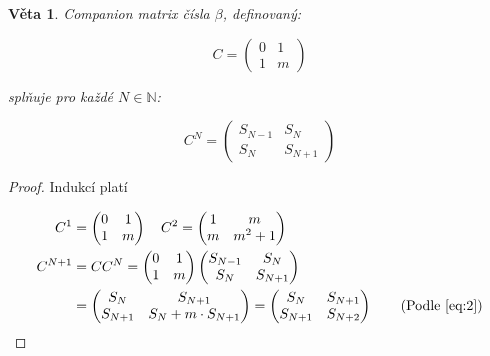\documentclass{article}
\newtheorem{veta}{Věta}[section]
\theoremstyle{definition}
\theoremstyle{definition}
\theoremstyle{remark}
\numberwithin{equation}{section}
\begin{document}
\begin{veta}

	\textit{Companion matrix} čísla $\beta$, definovaný:

	\begin{equation*}
		C =
		\begin{pmatrix}
			0 & 1 \\
			1 & m
		\end{pmatrix}
	\end{equation*}

	splňuje pro každé $N \in \mathbb{N}$:

	\begin{equation} \label{eq:3}
		C^N =
		\begin{pmatrix}
			S_{N - 1} & S_N       \\
			S_N       & S_{N + 1}
		\end{pmatrix}
	\end{equation}
\end{veta}

\begin{proof}
	Indukcí platí

	\begin{align*}
		C^1       & =
		\begin{pmatrix}
			0 & 1 \\
			1 & m
		\end{pmatrix}
		\quad
		C^2 =
		\begin{pmatrix}
			1 & m       \\
			m & m^2 + 1
		\end{pmatrix} \\
		C^{N + 1} & = CC^N =
		\begin{pmatrix}
			0 & 1 \\
			1 & m
		\end{pmatrix}
		\begin{pmatrix}
			S_{N - 1} & S_N       \\
			S_N       & S_{N + 1}
		\end{pmatrix}
		\\
		          & =
		\begin{pmatrix}
			S_{N}     & S_{N + 1}               \\
			S_{N + 1} & S_N + m \cdot S_{N + 1}
		\end{pmatrix}
		=
		\begin{pmatrix}
			S_{N}     & S_{N + 1} \\
			S_{N + 1} & S_{N + 2}
		\end{pmatrix} \tag{Podle \eqref{eq:2}}
	\end{align*}
\end{proof}
\end{document}

